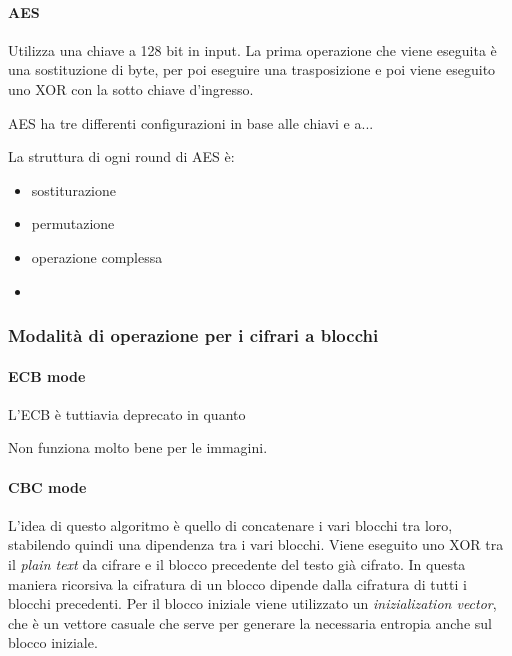 \paragraph{AES}

Utilizza una chiave a 128 bit in input. La prima operazione che viene eseguita è 
una sostituzione di byte, per poi eseguire una trasposizione e poi viene 
eseguito uno XOR con la sotto chiave d'ingresso.


AES ha tre differenti configurazioni in base alle chiavi e a... 


La struttura di ogni round di AES è:
\begin{itemize}
 \item sostiturazione
 \item permutazione
 \item operazione complessa
 \item {}
\end{itemize}

\subsubsection{Modalità di operazione per i cifrari a blocchi}


\paragraph{ECB mode}


L'ECB è tuttiavia deprecato in quanto 

Non funziona molto bene per le immagini.

\paragraph{CBC mode}

L'idea di questo algoritmo è quello di concatenare i vari blocchi tra loro, 
stabilendo quindi una dipendenza tra i vari blocchi. Viene eseguito uno XOR tra 
il \textit{plain text} da cifrare e il blocco precedente del testo già cifrato. 
In questa maniera ricorsiva la cifratura di un blocco dipende dalla cifratura di 
tutti i blocchi precedenti. Per il blocco iniziale viene utilizzato un 
\textit{inizialization vector}, che è un vettore casuale che serve per generare 
la necessaria entropia anche sul blocco iniziale.

